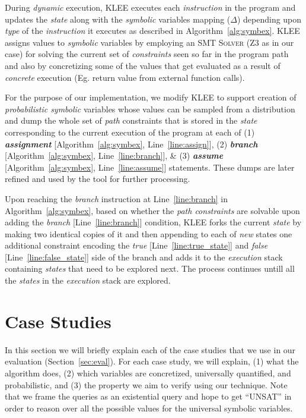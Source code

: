 \documentclass[acmsmall,review]{acmart}\settopmatter{}
\begin{document}
	During \textit{dynamic} execution, \textsc{KLEE} executes each \textit{instruction} in the program and updates the \textit{state} along with the \textit{symbolic} variables mapping ($\Delta$) depending upon \textit{type} of the \textit{instruction} it executes as described in Algorithm~\ref{alg:symbex}. 
	\textsc{KLEE} assigns values to \textit{symbolic} variables by employing an \textsc{SMT Solver} (\textsc{Z3} as in our case) for solving the current set of \textit{constraints} seen so far in the program path and also by concretizing some of the values that get evaluated as a result of \textit{concrete} execution (Eg. return value from external function calls). 
	
	For the purpose of our implementation, we modify \textsc{KLEE} to support creation of \textit{probabilistic symbolic} variables whose values can be sampled from a distribution and dump the whole set of \textit{path} constraints that is stored in the \textit{state} corresponding to the current execution of the program at each of (1) \textbf{\textit{assignment}} [Algorithm~\ref{alg:symbex}, Line~\ref{line:assign}], (2) \textbf{\textit{branch}} [Algorithm~\ref{alg:symbex}, Line~\ref{line:branch}], \& (3) \textbf{\textit{assume}} [Algorithm~\ref{alg:symbex}, Line~\ref{line:assume}] statements. These dumps are later refined and used by the tool for further processing.
	
	{\color{blue} Upon reaching the \textit{branch} instruction at Line~\ref{line:branch} in Algorithm~\ref{alg:symbex}, based on whether the \textit{path constraints} are solvable upon adding the \textit{branch} [Line~\ref{line:branch}] condition, \textsc{KLEE} forks the current \textit{state} by making two identical copies of it and then appending to each of \textit{new} states one additional constraint encoding the \textit{true} [Line~\ref{line:true_state}] and \textit{false} [Line~\ref{line:false_state}] side of the branch and adds it to the \textit{execution} stack containing \textit{states} that need to be explored next. The process continues untill all the \textit{states} in the \textit{execution} stack are explored.}
	
	
	\section{Case Studies}
	\label{sec:case_studies}
	In this section we will briefly explain each of the case studies that we use in our evaluation (Section~\ref{sec:eval}).
	For each case study, we will explain, (1) what the algorithm does, (2) which variables are concretized, universally quantified, and probabilistic, and (3) the property we aim to verify using our technique.
	Note that we frame the queries as an existential query and hope to get ``UNSAT'' in order to reason over all the possible values for the universal symbolic variables.
	
\end{document}
